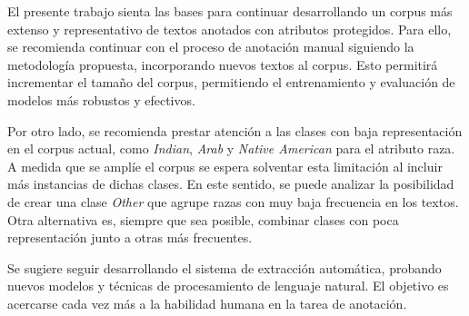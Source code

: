 \begin{recomendations}
    El presente trabajo sienta las bases para continuar desarrollando un corpus m\'as extenso y 
    representativo de textos anotados con atributos protegidos. Para ello, se recomienda 
    continuar con el proceso de anotaci\'on manual siguiendo la metodolog\'ia propuesta,
    incorporando nuevos textos al corpus. Esto permitir\'a incrementar el tama\~no del 
    corpus, permitiendo el entrenamiento y evaluaci\'on de modelos m\'as robustos y efectivos.
    
    Por otro lado, se recomienda prestar atenci\'on a las clases con baja representaci\'on en el 
    corpus actual, como \emph{Indian}, \emph{Arab} y \emph{Native American} para el atributo raza.
    A medida que se ampl\'ie el corpus se espera solventar esta limitaci\'on al incluir m\'as 
    instancias de dichas clases. En este sentido, se puede analizar la posibilidad de crear una 
    clase \emph{Other} que agrupe razas con muy baja frecuencia en los textos. Otra alternativa es, 
    siempre que sea posible, combinar clases con poca representaci\'on junto a otras m\'as 
    frecuentes.

    Se sugiere seguir desarrollando el sistema de extracci\'on autom\'atica, probando nuevos modelos
    y t\'ecnicas de procesamiento de lenguaje natural. El objetivo es acercarse cada vez m\'as a 
    la habilidad humana en la tarea de anotaci\'on.

\end{recomendations}
